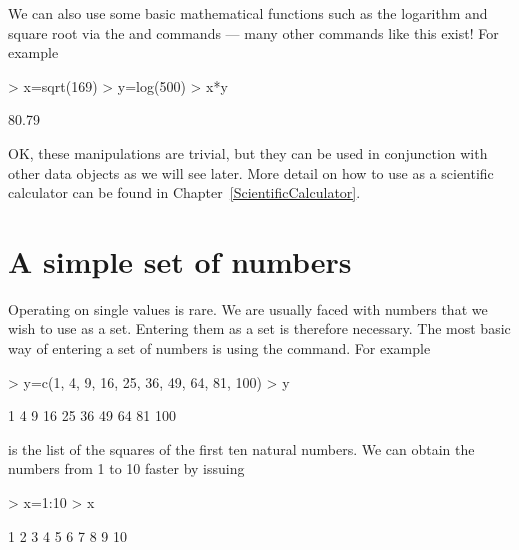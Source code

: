  
We can also use some basic mathematical functions such as the logarithm and square root via the  and  commands --- many other commands like this exist! For example 

\begin{Schunk}
\begin{Sinput}
> x=sqrt(169) 
> y=log(500) 
> x*y 
\end{Sinput}
\begin{Soutput}
[1] 80.79
\end{Soutput}
\end{Schunk}

OK, these manipulations are trivial, but they can be used in conjunction with other data objects as we will see later. More detail on how to use \R{} as a scientific calculator can be found in Chapter~\ref{ScientificCalculator}. 
 
 
\section{A simple set of numbers} 
 
Operating on single values is rare. We are usually faced with numbers that we wish to use as a set. Entering them as a set is therefore necessary. The most basic way of entering a set of numbers is using the  command. For example 

\begin{Schunk}
\begin{Sinput}
> y=c(1, 4, 9, 16, 25, 36, 49, 64, 81, 100) 
> y 
\end{Sinput}
\begin{Soutput}
 [1]   1   4   9  16  25  36  49  64  81 100
\end{Soutput}
\end{Schunk}

is the list of the squares of the first ten natural numbers. We can obtain the numbers from 1 to 10 faster by issuing 

\begin{Schunk}
\begin{Sinput}
> x=1:10 
> x 
\end{Sinput}
\begin{Soutput}
 [1]  1  2  3  4  5  6  7  8  9 10
\end{Soutput}
\end{Schunk}

